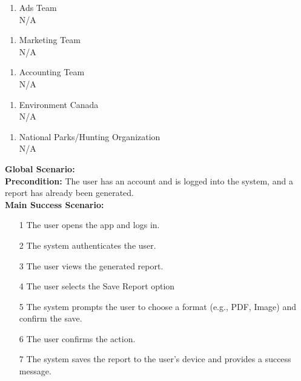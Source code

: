 \documentclass[]{article}
\begin{document}
\begin{enumerate}[{\bf BE1.}]
    \begin{enumerate}[{\bf VP2.}]
        \item Ads Team \\ 
        N/A
    \end{enumerate}

    \begin{enumerate}[{\bf VP3.}]
        \item Marketing Team \\
        N/A
    \end{enumerate}

    \begin{enumerate}[{\bf VP4.}]
        \item Accounting Team \\
        N/A
    \end{enumerate}

    \begin{enumerate}[{\bf VP5.}]
        \item Environment Canada \\
        N/A
    \end{enumerate}

    \begin{enumerate}[{\bf VP6.}]
        \item National Parks/Hunting Organization \\
        N/A
    \end{enumerate}


\textbf{Global Scenario:} \\
    \textbf{Precondition:} The user has an account and is logged into the system, and a report has already been generated. \\
    \textbf{Main Success Scenario:}
            \begin{enumerate}
                \item[1] The user opens the app and logs in.
                \item[2] The system authenticates the user.
                \item[3] The user views the generated report.
                \item[4] The user selects the Save Report option
                \item[5] The system prompts the user to choose a format (e.g., PDF, Image) and confirm the save.
                \item[6] The user confirms the action.
                \item[7] The system saves the report to the user’s device and provides a success message.
            \end{enumerate}


\end{enumerate}
\end{document}

